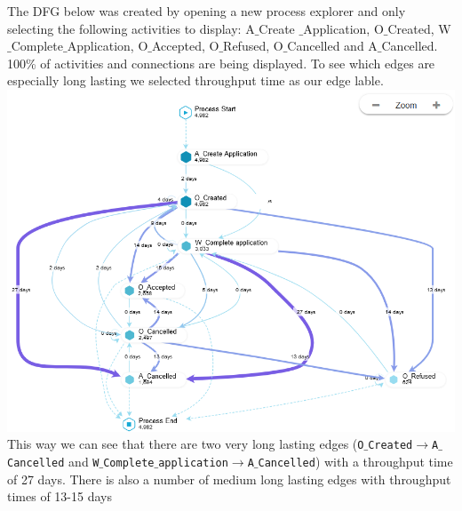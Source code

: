 \documentclass[../../main.tex]{subfiles}
\begin{document}
The DFG below was created by opening a new process explorer and only selecting the following activities to display: A$\_$Create $\_$Application, O$\_$Created, W$\_$Complete$\_$Application, O$\_$Accepted, O$\_$Refused, O$\_$Cancelled and A$\_$Cancelled. 100\% of activities and connections are being displayed. To see which edges are especially long lasting we selected throughput time as our edge lable.\\
\includegraphics[width=\textwidth]{img/QUESTION_5b_DFG.png}
This way we can see that there are two very long lasting edges (\texttt{O$\_$Created$\rightarrow$A$\_$Cancelled} and \texttt{W$\_$Complete$\_$application$\rightarrow$A$\_$Cancelled}) with a throughput time of 27 days. There is also a number of medium long lasting edges with throughput times of 13-15 days

\end{document}
